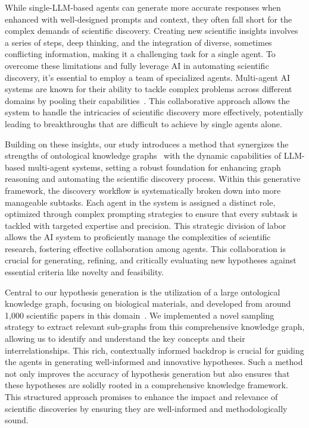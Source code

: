 \documentclass{article}
\begin{document}
While single-LLM-based agents can generate more accurate responses when enhanced with well-designed prompts and context, they often fall short for the complex demands of scientific discovery. Creating new scientific insights involves a series of steps, deep thinking, and the integration of diverse, sometimes conflicting information, making it a challenging task for a single agent. To overcome these limitations and fully leverage AI in automating scientific discovery, it's essential to employ a team of specialized agents. Multi-agent AI systems are known for their ability to tackle complex problems across different domains by pooling their capabilities~\cite{Ni2023Agent, m2024augmenting, stewart2024molecular, ghafarollahi2024protagents, ghafarollahi2024atomagents}. This collaborative approach allows the system to handle the intricacies of scientific discovery more effectively, potentially leading to breakthroughs that are difficult to achieve by single agents alone.

Building on these insights, our study introduces a method that synergizes the strengths of ontological knowledge graphs~\cite{Giesa2012CategoryDesign,Spivak2011CategoryNetworks} with the dynamic capabilities of LLM-based multi-agent systems, setting a robust foundation for enhancing graph reasoning and automating the scientific discovery process. Within this generative framework, the discovery workflow is systematically broken down into more manageable subtasks. Each agent in the system is assigned a distinct role, optimized through complex prompting strategies to ensure that every subtask is tackled with targeted expertise and precision. This strategic division of labor allows the AI system to proficiently manage the complexities of scientific research, fostering effective collaboration among agents. This collaboration is crucial for generating, refining, and critically evaluating new hypotheses against essential criteria like novelty and feasibility.

Central to our hypothesis generation is the utilization of a large ontological knowledge graph, focusing on biological materials, and developed from around 1,000 scientific papers in this domain~\cite{buehler2024accelerating}. We implemented a novel sampling strategy to extract relevant sub-graphs from this comprehensive knowledge graph, allowing us to identify and understand the key concepts and their interrelationships. This rich, contextually informed backdrop is crucial for guiding the agents in generating well-informed and innovative hypotheses. Such a method not only improves the accuracy of hypothesis generation but also ensures that these hypotheses are solidly rooted in a comprehensive knowledge framework. This structured approach promises to enhance the impact and relevance of scientific discoveries by ensuring they are well-informed and methodologically sound. 
\end{document}
